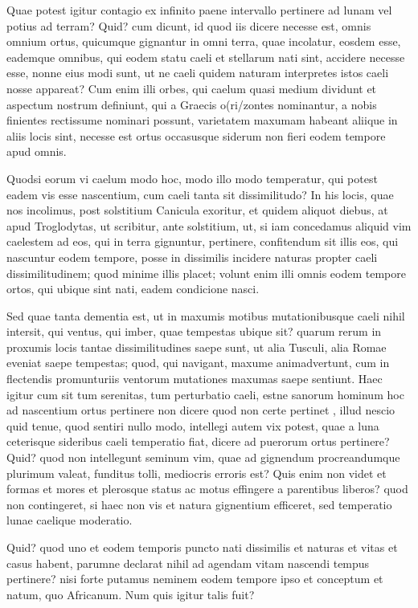  Quae potest igitur contagio ex infinito paene intervallo pertinere ad lunam vel potius ad terram? Quid? cum dicunt, id quod iis dicere necesse est, omnis omnium ortus, quicumque gignantur in omni terra, quae incolatur, eosdem esse, eademque omnibus, qui eodem statu caeli et stellarum nati sint, accidere necesse esse, nonne eius modi sunt, ut ne caeli quidem naturam interpretes istos caeli nosse appareat? Cum enim illi orbes, qui caelum quasi medium dividunt et aspectum nostrum definiunt, qui a Graecis o(ri/zontes nominantur, a nobis finientes rectissume nominari possunt, varietatem maxumam habeant aliique in aliis locis sint, necesse est ortus occasusque siderum non fieri eodem tempore apud omnis.

 Quodsi eorum vi caelum modo hoc, modo illo modo temperatur, qui potest eadem vis esse nascentium, cum caeli tanta sit dissimilitudo? In his locis, quae nos incolimus, post solstitium Canicula exoritur, et quidem aliquot diebus, at apud Troglodytas, ut scribitur, ante solstitium, ut, si iam concedamus aliquid vim caelestem ad eos, qui in terra gignuntur, pertinere, confitendum sit illis eos, qui nascuntur eodem tempore, posse in dissimilis incidere naturas propter caeli dissimilitudinem; quod minime illis placet; volunt enim illi omnis eodem tempore ortos, qui ubique sint nati, eadem condicione nasci.

 Sed quae tanta dementia est, ut in maxumis motibus mutationibusque caeli nihil intersit, qui ventus, qui imber, quae tempestas ubique sit? quarum rerum in proxumis locis tantae dissimilitudines saepe sunt, ut alia Tusculi, alia Romae eveniat saepe tempestas; quod, qui navigant, maxume animadvertunt, cum in flectendis promunturiis ventorum mutationes maxumas saepe sentiunt. Haec igitur cum sit tum serenitas, tum perturbatio caeli, estne sanorum hominum hoc ad nascentium ortus pertinere non dicere quod non certe pertinet , illud nescio quid tenue, quod sentiri nullo modo, intellegi autem vix potest, quae a luna ceterisque sideribus caeli temperatio fiat, dicere ad puerorum ortus pertinere? Quid? quod non intellegunt seminum vim, quae ad gignendum procreandumque plurimum valeat, funditus tolli, mediocris erroris est? Quis enim non videt et formas et mores et plerosque status ac motus effingere a parentibus liberos? quod non contingeret, si haec non vis et natura gignentium efficeret, sed temperatio lunae caelique moderatio.

 Quid? quod uno et eodem temporis puncto nati dissimilis et naturas et vitas et casus habent, parumne declarat nihil ad agendam vitam nascendi tempus pertinere? nisi forte putamus neminem eodem tempore ipso et conceptum et natum, quo Africanum. Num quis igitur talis fuit?

